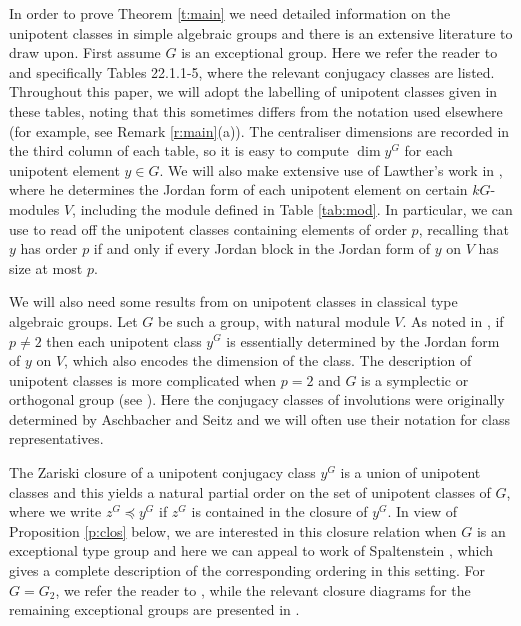 \documentclass[twoside,a4paper,reqno,11pt]{amsart}
\newcommand{\<}{\langle}
\renewcommand{\>}{\rangle}
\renewcommand{\:}{\colon}
\theoremstyle{plain}
\theoremstyle{definition}
\begin{document}
In order to prove Theorem \ref{t:main} we need detailed information on the unipotent classes in simple algebraic groups and there is an extensive literature to draw upon. First assume $G$ is an exceptional group. Here we refer the reader to \cite{LS_book} and specifically Tables 22.1.1-5, where the relevant conjugacy classes are listed. Throughout this paper, we will adopt the labelling of unipotent classes given in these tables, noting that this sometimes differs from the notation used elsewhere (for example, see Remark \ref{r:main}(a)). The centraliser dimensions are recorded in the third column of each table, so it is easy to compute $\dim y^G$ for each unipotent element $y \in G$. We will also make extensive use of Lawther's work in \cite{Law1}, where he determines the Jordan form of each unipotent element on certain $kG$-modules $V$, including the module defined in Table \ref{tab:mod}. In particular, we can use \cite{Law1} to read off the unipotent classes containing elements of order $p$, recalling that $y$ has order $p$ if and only if every Jordan block in the Jordan form of $y$ on $V$ has size at most $p$.

We will also need some results from \cite{LS_book} on unipotent classes in classical type algebraic groups. Let $G$ be such a group, with natural module $V$. As noted in \cite[Theorem 3.1]{LS_book}, if $p \ne 2$ then each unipotent class $y^G$ is essentially determined by the Jordan form of $y$ on $V$, which also encodes the dimension of the class. The description of unipotent classes is more complicated when $p=2$ and $G$ is a symplectic or orthogonal group (see \cite[Theorem 4.2]{LS_book}). Here the conjugacy classes of involutions were originally determined by Aschbacher and Seitz \cite[Sections 7,8]{AS} and we will often use their notation for class representatives. 

The Zariski closure of a unipotent conjugacy class $y^G$ is a union of unipotent classes and this yields a natural partial order on the set of unipotent classes of $G$, where we write $z^G \preccurlyeq y^G$ if $z^G$ is contained in the closure of $y^G$. In view of Proposition \ref{p:clos} below, we are interested in this closure relation when $G$ is an exceptional type group and here we can appeal to work of Spaltenstein \cite{Spal}, which gives a complete description of the corresponding ordering in this setting. For $G = G_2$, we refer the reader to \cite[Section II.10]{Spal}, while the relevant closure diagrams for the remaining exceptional groups are presented in \cite[Section IV.2]{Spal}.
\end{document}
